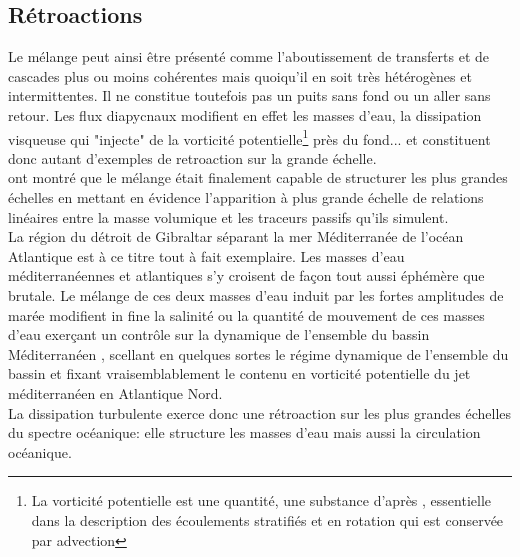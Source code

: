 \subsection{Rétroactions}
\label{subsection_retroactions}
Le mélange peut ainsi être présenté comme l'aboutissement de transferts et de cascades plus ou moins cohérentes mais quoiqu'il en soit très hétérogènes et intermittentes. Il ne constitue toutefois pas un puits sans fond ou un aller sans retour. Les flux diapycnaux modifient en effet les masses d'eau, la dissipation visqueuse qui "injecte" de la vorticité potentielle\footnote{La vorticité potentielle est une quantité, une substance d'après \cite{haynes_conservation_1990}, essentielle dans la description des écoulements stratifiés et en rotation qui est conservée par advection} près du fond... et constituent donc autant d'exemples de retroaction sur la grande échelle.\\
\cite{penney_2020} ont montré que le mélange était finalement capable de structurer les plus grandes échelles en mettant en évidence l'apparition à plus grande échelle de relations linéaires entre la masse volumique et les traceurs passifs qu'ils simulent.\\
La région du détroit de Gibraltar séparant la mer Méditerranée de l'océan Atlantique est à ce titre tout à fait exemplaire. Les masses d'eau méditerranéennes et atlantiques s'y croisent de façon tout aussi éphémère que brutale. Le mélange de ces deux masses d'eau induit par les fortes amplitudes de marée modifient in fine la salinité ou la quantité de mouvement de ces masses d'eau exerçant un contrôle sur la dynamique de l'ensemble du bassin Méditerranéen \citep{armi_1988}, scellant en quelques sortes le régime dynamique de l'ensemble du bassin et fixant vraisemblablement le contenu en vorticité potentielle du jet méditerranéen en Atlantique Nord.\\
La dissipation turbulente exerce donc une rétroaction sur les plus grandes échelles du spectre océanique: elle  structure les masses d'eau mais aussi la circulation océanique.
\color{black}

